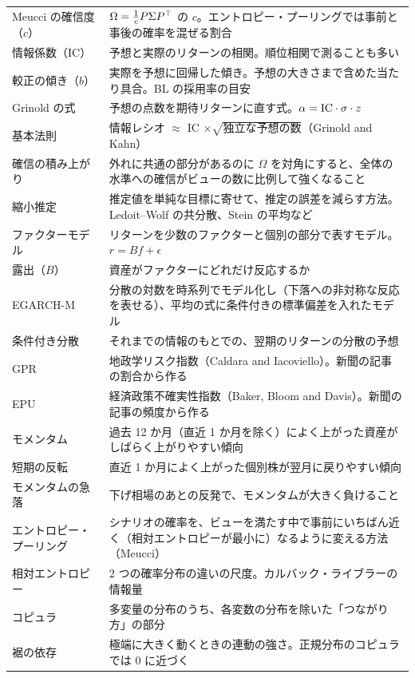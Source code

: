 \begin{longtable}{p{3.6cm}p{10.0cm}}
Meucci の確信度（$c$） & $\Omega=\frac1cP\Sigma P^{\top}$ の $c$。エントロピー・プーリングでは事前と事後の確率を混ぜる割合 \\
情報係数（IC） & 予想と実際のリターンの相関。順位相関で測ることも多い \\
較正の傾き（$b$） & 実際を予想に回帰した傾き。予想の大きさまで含めた当たり具合。BL の採用率の目安 \\
Grinold の式 & 予想の点数を期待リターンに直す式。$\alpha=\mathrm{IC}\cdot\sigma\cdot z$ \\
基本法則 & 情報レシオ $\approx$ IC $\times\sqrt{\text{独立な予想の数}}$（Grinold and Kahn） \\
確信の積み上がり & 外れに共通の部分があるのに $\Omega$ を対角にすると、全体の水準への確信がビューの数に比例して強くなること \\
縮小推定 & 推定値を単純な目標に寄せて、推定の誤差を減らす方法。Ledoit--Wolf の共分散、Stein の平均など \\
ファクターモデル & リターンを少数のファクターと個別の部分で表すモデル。$r=Bf+\epsilon$ \\
露出（$B$） & 資産がファクターにどれだけ反応するか \\
EGARCH-M & 分散の対数を時系列でモデル化し（下落への非対称な反応を表せる）、平均の式に条件付きの標準偏差を入れたモデル \\
条件付き分散 & それまでの情報のもとでの、翌期のリターンの分散の予想 \\
GPR & 地政学リスク指数（Caldara and Iacoviello）。新聞の記事の割合から作る \\
EPU & 経済政策不確実性指数（Baker, Bloom and Davis）。新聞の記事の頻度から作る \\
モメンタム & 過去 12 か月（直近 1 か月を除く）によく上がった資産がしばらく上がりやすい傾向 \\
短期の反転 & 直近 1 か月によく上がった個別株が翌月に戻りやすい傾向 \\
モメンタムの急落 & 下げ相場のあとの反発で、モメンタムが大きく負けること \\
エントロピー・プーリング & シナリオの確率を、ビューを満たす中で事前にいちばん近く（相対エントロピーが最小に）なるように変える方法（Meucci） \\
相対エントロピー & 2 つの確率分布の違いの尺度。カルバック・ライブラーの情報量 \\
コピュラ & 多変量の分布のうち、各変数の分布を除いた「つながり方」の部分 \\
裾の依存 & 極端に大きく動くときの連動の強さ。正規分布のコピュラでは 0 に近づく \\

\end{longtable}
